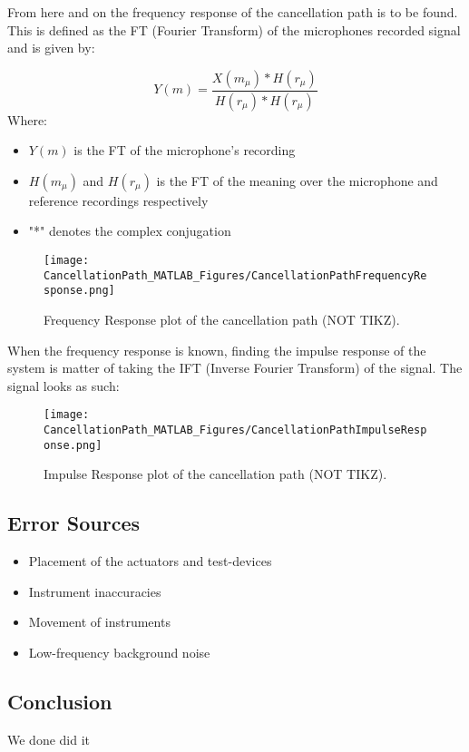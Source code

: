 %	


From here and on the frequency response of the cancellation path is to be found. This is defined as the FT (Fourier Transform) of the microphones recorded signal and is given by:

\begin{equation}
\label{FrequencyResponseEq}
Y(m) = \frac{X(m_{\mu}) *  H(r_{\mu})}{H(r_{\mu}) *  H(r_{\mu})}
\end{equation}
Where:
\begin{itemize}
	\item $Y(m)$ is the FT of the microphone's recording
	\item $H(m_{\mu})$ and $H(r_{\mu})$ is the FT of the meaning over the microphone and reference recordings respectively
	\item "*" denotes the complex conjugation
\end{itemize}

\begin{figure}[H]
	\centering
	\texttt{[image: CancellationPath\_MATLAB\_Figures/CancellationPathFrequencyResponse.png]}
	\caption{Frequency Response plot of the cancellation path (NOT TIKZ).}
	\label{FrequencyResponsePlotCancellationPath}
\end{figure}

When the frequency response is known, finding the impulse response of the system is matter of taking the IFT (Inverse Fourier Transform) of the signal.
The signal looks as such:

\begin{figure}[H]
	\centering
	\texttt{[image: CancellationPath\_MATLAB\_Figures/CancellationPathImpulseResponse.png]}
	\caption{Impulse Response plot of the cancellation path (NOT TIKZ).}
	\label{CancellationPathImpulseResponse}
\end{figure}

\subsection{Error Sources}
\begin{itemize}
	\item Placement of the actuators and test-devices
	\item Instrument inaccuracies 
	\item Movement of instruments
	\item Low-frequency background noise
\end{itemize}

\subsection{Conclusion}
We done did it